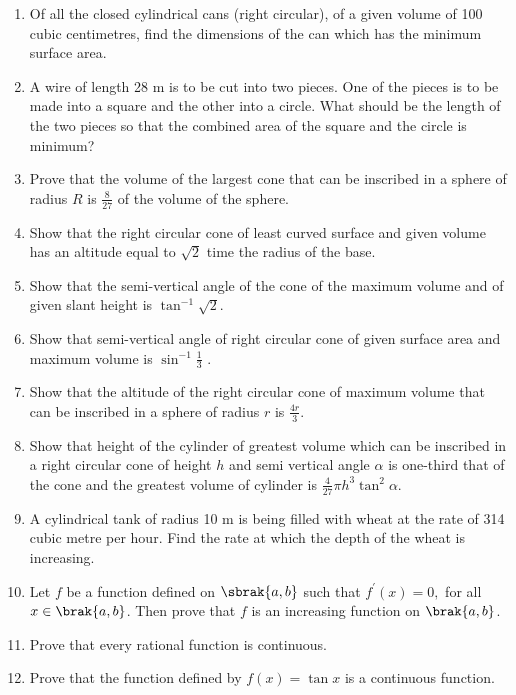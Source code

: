 \begin{enumerate}[label=\arabic*.,ref=\thesubsection.\theenumi]
\item  Of all the closed cylindrical cans (right circular), of a given volume of 100 cubic centimetres, find the dimensions of the can which has the minimum surface area.
\item  A wire of length 28 m is to be cut into two pieces. One of the pieces is to be made into a square and the other into a circle. What should be the length of the two pieces so that the combined area of the square and the circle is minimum?
\item  Prove that the volume of the largest cone that can be inscribed in a sphere of radius $R$ is
$\frac{8}{ 27}$ of the volume of the sphere.
\item  Show that the right circular cone of least curved surface and given volume has an altitude equal to $\sqrt{2}$ time the radius of the base.
\item  Show that the semi-vertical angle of the cone of the maximum volume and of given slant height is
$\tan^{-1} \sqrt{2}$.

\item  Show that semi-vertical angle of right circular cone of given surface area and maximum volume is $\sin^{-1} \frac{1}{ 3}$
.
\item Show that the altitude of the right circular cone of maximum volume that can be inscribed in a sphere of radius $r$ is $\frac{4r}{ 3}$.
\item Show that height of the cylinder of greatest volume which can be inscribed in a right circular cone of height $h$ and semi vertical angle $\alpha $ is one-third that of the cone and the greatest volume of cylinder is $\frac{4}{27} \pi h^3 \tan^2\alpha $.
\item A cylindrical tank of radius 10 m is being filled with wheat at the rate of 314 cubic metre per hour. Find the rate at which the depth of the wheat is increasing.
\item Let $f$ be a function defined on $\sbrak{a,b}$ such that $f^{\prime}(x) = 0,$ for all $x \in \brak{a,b}$.  Then prove that $f$ is an increasing function on $\brak{a,b}$.
%
\item Prove that every rational function is continuous.
\item Prove that the function defined by $f(x) = \tan x$ is a continuous function.
\end{enumerate}
